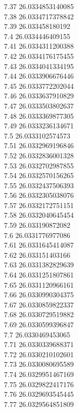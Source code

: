 {7.37	26.0334853140085\\
7.38	26.0334717378842\\
7.39	26.033458180192\\
7.4	26.0334446409155\\
7.41	26.0334311200388\\
7.42	26.0334176175455\\
7.43	26.0334041334195\\
7.44	26.0333906676446\\
7.45	26.0333772202044\\
7.46	26.0333637910829\\
7.47	26.0333503802637\\
7.48	26.0333369877305\\
7.49	26.0333236134671\\
7.5	26.0333102574573\\
7.51	26.0332969196846\\
7.52	26.0332836001328\\
7.53	26.0332702987855\\
7.54	26.0332570156265\\
7.55	26.0332437506393\\
7.56	26.0332305038076\\
7.57	26.0332172751151\\
7.58	26.0332040645454\\
7.59	26.033190872082\\
7.6	26.0331776977086\\
7.61	26.0331645414087\\
7.62	26.033151403166\\
7.63	26.0331382829639\\
7.64	26.0331251807861\\
7.65	26.0331120966161\\
7.66	26.0330990304375\\
7.67	26.0330859822337\\
7.68	26.0330729519882\\
7.69	26.0330599396847\\
7.7	26.0330469453065\\
7.71	26.0330339688371\\
7.72	26.0330210102601\\
7.73	26.0330080695589\\
7.74	26.0329951467169\\
7.75	26.0329822417176\\
7.76	26.0329693545445\\
7.77	26.0329564851809\\
}
